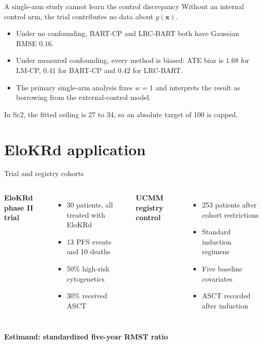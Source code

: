 \documentclass[11pt,aspectratio=169]{beamer}
\newcommand{\bx}{\bm{x}}
\newcommand{\key}[1]{{\color{AccentBlue}\textbf{#1}}}
\newcommand{\sectionframe}[1]{%
  \begin{frame}[plain]
    \vspace*{0.46\paperheight}
    \hspace*{0.65cm}{\LARGE\bfseries #1}
  \end{frame}}
\begin{document}
\begin{frame}{A single-arm study cannot learn the control discrepancy}
  \large
  Without an internal control arm, the trial contributes no data about $g(\bx)$.

  \vspace{0.9em}
  \begin{itemize}\setlength\itemsep{0.75em}
    \item Under no confounding, BART-CP and LRC-BART both have Gaussian RMSE $0.16$.
    \item Under measured confounding, every method is biased: ATE bias is $1.68$ for LM-CP, $0.41$ for BART-CP and $0.42$ for LRC-BART.
    \item The primary single-arm analysis fixes $w=1$ and interprets the result as borrowing from the external-control model.
  \end{itemize}

  \vfill
  {\small In Sc2, the fitted ceiling is 27 to 34, so an absolute target of 100 is capped.}
\end{frame}

\section{EloKRd application}
\sectionframe{EloKRd and the UCMM registry}

\begin{frame}{Trial and registry cohorts}
  \large
  \begin{columns}[T,onlytextwidth]
      \textbf{\color{UChicagoMaroon}EloKRd phase II trial}
      \begin{itemize}\setlength\itemsep{0.55em}
        \item 30 patients, all treated with EloKRd
        \item 13 PFS events and 10 deaths
        \item 50\% high-risk cytogenetics
        \item 30\% received ASCT
      \end{itemize}

      \textbf{\color{UChicagoMaroon}UCMM registry control}
      \begin{itemize}\setlength\itemsep{0.55em}
        \item 253 patients after cohort restrictions
        \item Standard induction regimens
        \item Five baseline covariates
        \item ASCT recorded after induction
      \end{itemize}
  \end{columns}

  \vfill
  \centering
  \key{Estimand: standardized five-year RMST ratio}
\end{frame}
\end{document}
